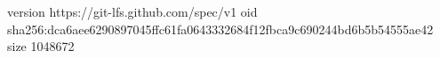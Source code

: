 version https://git-lfs.github.com/spec/v1
oid sha256:dca6aee6290897045ffc61fa0643332684f12fbca9c690244bd6b5b54555ae42
size 1048672
